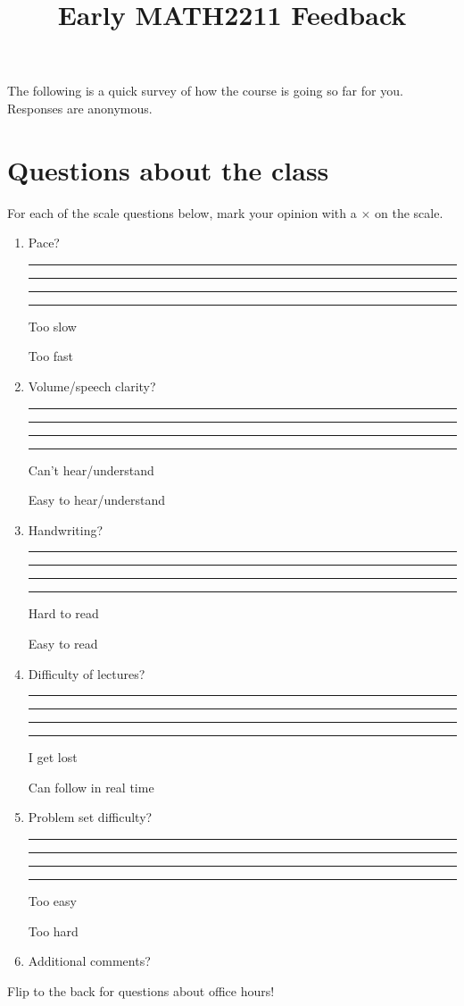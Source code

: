 \documentclass[11pt,oneside]{amsart}
\title{Early MATH2211 Feedback}
\author{}
\newcommand\ScaleLine[2]{%
  \parbox{\linewidth}{%
    \rule{0.2\linewidth}{0pt}
    \rule[-5pt]{0.4pt}{10pt}\hrulefill\rule[-5pt]{0.4pt}{10pt}%
    \rule{0.2\linewidth}{0pt}\vspace*{7pt}\newline
       \parbox{0.4\linewidth}{\centering #1}\hfill\parbox{0.4\linewidth}{\centering #2}
  }
}
\begin{document}
    \maketitle
    
    The following is a quick survey of how the course is going so far for you. Responses are anonymous.

    \section{Questions about the class}
    For each of the scale questions below, mark your opinion with a $\times$ on the scale.
    \begin{enumerate}
        \item Pace?
        
            \ScaleLine{Too slow}{Too fast}

        \item Volume/speech clarity?

        \ScaleLine{Can't hear/understand}{Easy to hear/understand}

        \item Handwriting?

        \ScaleLine{Hard to read}{Easy to read}

        \item Difficulty of lectures?
        
        \ScaleLine{I get lost}{Can follow in real time}

        \item Problem set difficulty?
        
        \ScaleLine{Too easy}{Too hard}

        \item Additional comments?
        \vfill
    \end{enumerate}

    Flip to the back for questions about office hours!
    \newpage
\end{document}
